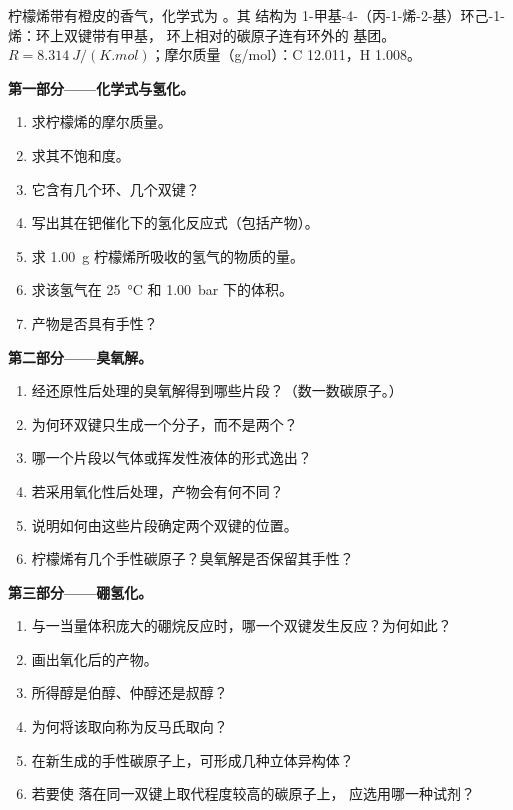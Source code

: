 \begin{problem}
\label{pb:b2:alkene-redox:1}
柠檬烯带有橙皮的香气，化学式为 。其
结构为 1-甲基-4-（丙-1-烯-2-基）环己-1-烯：环上双键带有甲基，
环上相对的碳原子连有环外的  基团。$R =
\qty{8.314}{J/(K.mol)}$；摩尔质量（\unit{g/mol}）：C 12.011，H 1.008。

\medskip
\noindent\textbf{第一部分——化学式与氢化。}
\begin{enumerate}
  \item 求柠檬烯的摩尔质量。
  \item 求其不饱和度。
  \item 它含有几个环、几个双键？
  \item 写出其在钯催化下的氢化反应式（包括产物）。
  \item 求 \qty{1.00}{g} 柠檬烯所吸收的氢气的物质的量。
  \item 求该氢气在 \qty{25}{\degreeCelsius} 和 \qty{1.00}{bar} 下的体积。
  \item 产物是否具有手性？
\end{enumerate}

\medskip
\noindent\textbf{第二部分——臭氧解。}
\begin{enumerate}[resume]
  \item 经还原性后处理的臭氧解得到哪些片段？（数一数碳原子。）
  \item 为何环双键只生成一个分子，而不是两个？
  \item 哪一个片段以气体或挥发性液体的形式逸出？
  \item 若采用氧化性后处理，产物会有何不同？
  \item 说明如何由这些片段确定两个双键的位置。
  \item 柠檬烯有几个手性碳原子？臭氧解是否保留其手性？
\end{enumerate}

\medskip
\noindent\textbf{第三部分——硼氢化。}
\begin{enumerate}[resume]
  \item 与一当量体积庞大的硼烷反应时，哪一个双键发生反应？为何如此？
  \item 画出氧化后的产物。
  \item 所得醇是伯醇、仲醇还是叔醇？
  \item 为何将该取向称为反马氏取向？
  \item 在新生成的手性碳原子上，可形成几种立体异构体？
  \item 若要使  落在同一双键上取代程度较高的碳原子上，
        应选用哪一种试剂？
\end{enumerate}


\end{problem}
